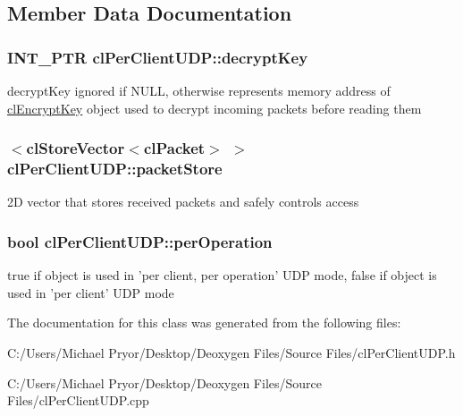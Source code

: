 \subsection{Member Data Documentation}
\hypertarget{classcl_per_client_u_d_p_a997243e373a1d997f27b111d06cccd90}{
\subsubsection[{decryptKey}]{\setlength{\rightskip}{0pt plus 5cm}INT\_\-PTR {\bf clPerClientUDP::decryptKey}}}
\label{classcl_per_client_u_d_p_a997243e373a1d997f27b111d06cccd90}
decryptKey ignored if NULL, otherwise represents memory address of \hyperlink{classcl_encrypt_key}{clEncryptKey} object used to decrypt incoming packets before reading them \hypertarget{classcl_per_client_u_d_p_a7ed46a6713cec6ebc3c788d7542bdc58}{
\subsubsection[{packetStore}]{$<${\bf clStoreVector}$<${\bf clPacket}$>$ $>$ {\bf clPerClientUDP::packetStore}}}
\label{classcl_per_client_u_d_p_a7ed46a6713cec6ebc3c788d7542bdc58}
2D vector that stores received packets and safely controls access \hypertarget{classcl_per_client_u_d_p_ae270ad0657e279032f9e1bebee3f0698}{
\subsubsection[{perOperation}]{\setlength{\rightskip}{0pt plus 5cm}bool {\bf clPerClientUDP::perOperation}}}
\label{classcl_per_client_u_d_p_ae270ad0657e279032f9e1bebee3f0698}
true if object is used in 'per client, per operation' UDP mode, false if object is used in 'per client' UDP mode 

The documentation for this class was generated from the following files:\begin{DoxyCompactItemize}
\item 
C:/Users/Michael Pryor/Desktop/Deoxygen Files/Source Files/clPerClientUDP.h\item 
C:/Users/Michael Pryor/Desktop/Deoxygen Files/Source Files/clPerClientUDP.cpp\end{DoxyCompactItemize}
